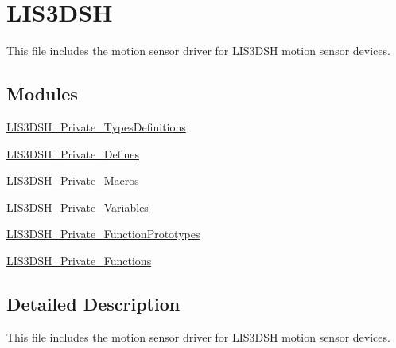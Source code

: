 \hypertarget{group__LIS3DSH}{\section{L\-I\-S3\-D\-S\-H}
\label{group__LIS3DSH}
}


This file includes the motion sensor driver for L\-I\-S3\-D\-S\-H motion sensor devices.  


\subsection*{Modules}
\begin{DoxyCompactItemize}
\item 
\hyperlink{group__LIS3DSH__Private__TypesDefinitions}{L\-I\-S3\-D\-S\-H\-\_\-\-Private\-\_\-\-Types\-Definitions}
\item 
\hyperlink{group__LIS3DSH__Private__Defines}{L\-I\-S3\-D\-S\-H\-\_\-\-Private\-\_\-\-Defines}
\item 
\hyperlink{group__LIS3DSH__Private__Macros}{L\-I\-S3\-D\-S\-H\-\_\-\-Private\-\_\-\-Macros}
\item 
\hyperlink{group__LIS3DSH__Private__Variables}{L\-I\-S3\-D\-S\-H\-\_\-\-Private\-\_\-\-Variables}
\item 
\hyperlink{group__LIS3DSH__Private__FunctionPrototypes}{L\-I\-S3\-D\-S\-H\-\_\-\-Private\-\_\-\-Function\-Prototypes}
\item 
\hyperlink{group__LIS3DSH__Private__Functions}{L\-I\-S3\-D\-S\-H\-\_\-\-Private\-\_\-\-Functions}
\end{DoxyCompactItemize}


\subsection{Detailed Description}
This file includes the motion sensor driver for L\-I\-S3\-D\-S\-H motion sensor devices. 